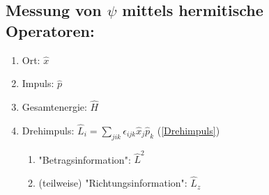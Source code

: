 \subsection{Messung von $\psi$ mittels hermitische Operatoren:} \label{Operatoren}
\begin{enumerate}
    \item Ort: $\hat{x}$
    \item Impuls: $\hat{p}$
    \item Gesamtenergie: $\hat{H}$
    \item Drehimpuls: $\hat{L}_i=\sum_{jik}\epsilon_{ijk}\hat{x}_j\hat{p}_k$ (\ref{Drehimpuls})
    \begin{enumerate}
        \item "Betragsinformation": $\hat{L}^2$
        \item (teilweise) "Richtungsinformation": $\hat{L}_z$
    \end{enumerate}

\end{enumerate}

